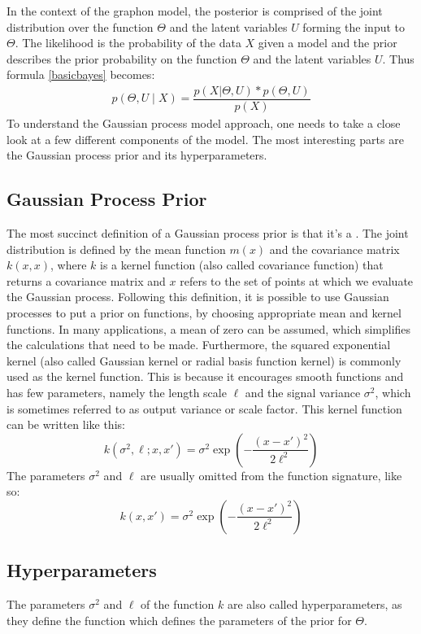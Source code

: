 \documentclass[11pt]{report} %
\begin{document}
In the context of the graphon model, the posterior is comprised of the joint distribution over the function $\Theta$ and the latent variables $U$ forming the input to $\Theta$. The likelihood is the probability of the data $X$ given a model and the prior describes the prior probability on the function $\Theta$ and the latent variables $U$. Thus formula \ref{basicbayes} becomes:
\begin{align}
\label{bayes2}
p(\Theta, U\mid X) = \dfrac{p(X|\Theta,U) * p(\Theta,U)}{p(X)}
\end{align}
To understand the Gaussian process model approach, one needs to take a close look at a few different components of the model. The most interesting parts are the Gaussian process prior and its hyperparameters.
    \subsection{Gaussian Process Prior}
The most succinct definition of a Gaussian process prior is that it's a  \cite[~p. 13]{rasmussen2005}. The joint distribution is defined by the mean function $m(x)$ and the covariance matrix $k(x,x)$, where $k$ is a kernel function (also called covariance function) that returns a covariance matrix and $x$ refers to the set of points at which we evaluate the Gaussian process. Following this definition, it is possible to use Gaussian processes to put a prior on functions, by choosing appropriate mean and kernel functions. In many applications, a mean of zero can be assumed, which simplifies the calculations that need to be made. Furthermore, the squared exponential kernel (also called Gaussian kernel or radial basis function kernel) is commonly used as the kernel function. This is because it encourages smooth functions and has few parameters, namely the length scale $\ell$ and the signal variance $\sigma^2$, which is sometimes referred to as output variance or scale factor. This kernel function can be written like this:
$$ k(\sigma^2,\ell;x,x')=\sigma^2\exp{\left( -\dfrac{(x-x')^2}{2\ell^2} \right) } $$
The parameters $\sigma^2$ and $\ell$ are usually omitted from the function signature, like so:
$$ k(x,x')=\sigma^2\exp{\left( -\dfrac{(x-x')^2}{2\ell^2}\right)} $$
\subsection{Hyperparameters}
The parameters $\sigma^2$ and $\ell$ of the function $k$ are also called hyperparameters, as they define the function which defines the parameters of the prior for $\Theta$. 
\end{document}
